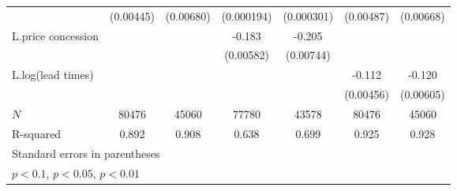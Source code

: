 {\begin{tabular}{l*{6}{c}}
            &   (0.00445)         &   (0.00680)         &  (0.000194)         &  (0.000301)         &   (0.00487)         &   (0.00668)         \\
\addlinespace
L.price concession&                     &                     &      -0.183\sym{***}&      -0.205\sym{***}&                     &                     \\
            &                     &                     &   (0.00582)         &   (0.00744)         &                     &                     \\
\addlinespace
L.log(lead times)   &                     &                     &                     &                     &      -0.112\sym{***}&      -0.120\sym{***}\\
            &                     &                     &                     &                     &   (0.00456)         &   (0.00605)         \\
\midrule
\(N\)       &       80476         &       45060         &       77780         &       43578         &       80476         &       45060         \\
R-squared   &       0.892         &       0.908         &       0.638         &       0.699         &       0.925         &       0.928         \\
\bottomrule
\multicolumn{7}{l}{\footnotesize Standard errors in parentheses}\\
\multicolumn{7}{l}{\footnotesize \sym{*} \(p<0.1\), \sym{**} \(p<0.05\), \sym{***} \(p<0.01\)}\\
\end{tabular}
}
